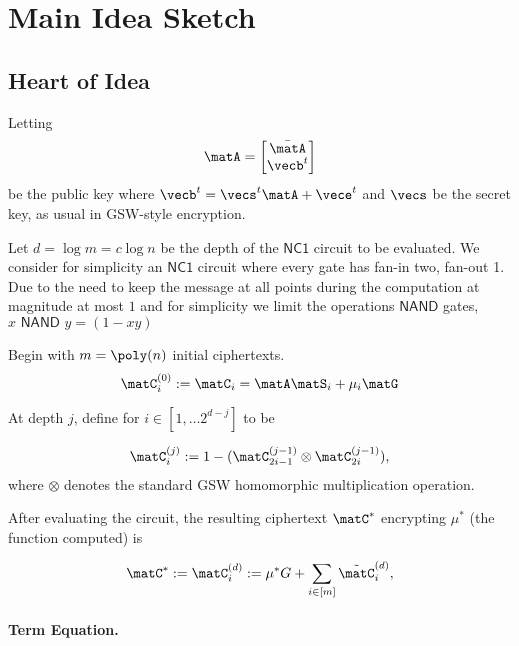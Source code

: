 \section{Main Idea Sketch}
\label{sec:mainidea}

\subsection{Heart of Idea}
\label{sec:heartofidea}




Letting
\[\matA=\begin{bmatrix}\bar{\matA}\\ \vecb^{t}\\\end{bmatrix}\] be the
public key where $\vecb^{t}=\vecs^{t}\matA+\vece^{t}$ and $\vecs$ be
the secret key, as usual in GSW-style encryption.

Let
$d=\log{m}=c\log{n}$ be the depth of the $\textsf{NC1}$ circuit to be
evaluated. We consider for simplicity an $\textsf{NC1}$ circuit where
every gate has fan-in two, fan-out 1. Due to the need to keep the
message at all points during the computation at magnitude at most
$1$ and for simplicity we limit the operations $\textsf{NAND}$ gates,
$x \textsf{ NAND }
y = (1-xy)$ 



Begin with $m=\poly(n)$ initial ciphertexts. 
\begin{equation}\matC^{(0)}_{i}:=\matC_{i}=\matA\matS_{i}+\mu_{i}\matG\end{equation}


At depth $j$, define for $i \in [1,\ldots 2^{d-j}]$ to be 

\[\matC^{(j)}_{i}:=1-(\matC^{(j-1)}_{2i - 1} \otimes
  \matC^{(j-1)}_{2i}),\]
where $\otimes$ denotes the standard GSW homomorphic multiplication operation.


After evaluating the circuit, the resulting ciphertext $\matC^{*}$
encrypting $\mu^*$ (the function computed) is 


\begin{equation}\matC^{*}:=\matC^{(d)}_{i}:=\mu^{*}G+\sum_{i \in
    [m]}\tilde{\matC}^{(d)}_{i},\end{equation}

\paragraph{Term Equation.} 

